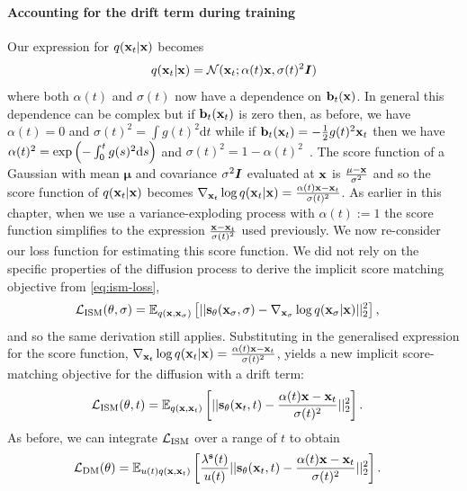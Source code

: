 \paragraph{Accounting for the drift term during training}
Our expression for $q({\mathbf{x}}_t|{\mathbf{x}})$ becomes
\begin{align}
    q({\mathbf{x}}_t|{\mathbf{x}}) = {\mathcal{N}}({\mathbf{x}}_t; \alpha(t){\mathbf{x}}, \sigma(t)^2{\bm{I}})
\end{align}
where both $\alpha(t)$ and $\sigma(t)$ now have a dependence on ${\mathbf{b}}_t({\mathbf{x}})$. In general this dependence can be complex but if ${\mathbf{b}}_t({\mathbf{x}}_t)$ is zero then, as before, we have $\alpha(t) = 0$ and $\sigma(t)^2 = \int g(t)^2 \mathrm{d}t$ while if ${\mathbf{b}}_t({\mathbf{x}}_t) = - \frac{1}{2}g(t)^2{\mathbf{x}}_t$ then we have $\alpha(t)^2 = \text{exp}\left( - \int_0^t g(s)^2 \mathrm{d} s \right)$ and $\sigma(t)^2 = 1 - \alpha(t)^2$~\citep{song2020score}. The score function of a Gaussian with mean $\mathbf{\mu}$ and covariance $\sigma^2{\bm{I}}$ evaluated at ${\mathbf{x}}$ is $\frac{\mathbf{\mu} - {\mathbf{x}}}{\sigma^2}$ and so the score function of $q({\mathbf{x}}_t|{\mathbf{x}})$ becomes $\nabla_{{\mathbf{x}}_t} \log q({\mathbf{x}}_t|{\mathbf{x}}) = \frac{\alpha(t){\mathbf{x}} - {\mathbf{x}}_t}{\sigma(t)^2}$. As earlier in this chapter, when we use a variance-exploding process with $\alpha(t) := 1$ the score function simplifies to the expression $\frac{{\mathbf{x}}-{\mathbf{x}}_t}{\sigma(t)^2}$ used previously. We now re-consider our loss function for estimating this score function. We did not rely on the specific properties of the diffusion process to derive the implicit score matching objective from \cref{eq:ism-loss},
\begin{align} \label{eq:ism-loss-with-drift}
    \mathcal{L}_\text{ISM}(\theta, \sigma) &= \mathbb{E}_{q({\mathbf{x}}, {\mathbf{x}}_\sigma)} \left[ 
    || {\mathbf{s}}_\theta({\mathbf{x}}_\sigma, \sigma) - \nabla_{{\mathbf{x}}_\sigma} \log q({\mathbf{x}}_\sigma|{\mathbf{x}}) ||_2^2 \right],
\end{align}
and so the same derivation still applies. Substituting in the generalised expression for the score function, $\nabla_{{\mathbf{x}}_t} \log q({\mathbf{x}}_t|{\mathbf{x}}) = \frac{\alpha(t){\mathbf{x}} - {\mathbf{x}}_t}{\sigma(t)^2}$, yields a new implicit score-matching objective for the diffusion with a drift term:
\begin{align}
    \mathcal{L}_\text{ISM}(\theta, t) &= \mathbb{E}_{q({\mathbf{x}}, {\mathbf{x}}_t)} \left[ || {\mathbf{s}}_\theta({\mathbf{x}}_t, t) - \frac{\alpha(t){\mathbf{x}} - {\mathbf{x}}_t}{\sigma(t)^2} ||_2^2 \right].
\end{align}
As before, we can integrate ${\mathcal{L}}_\text{ISM}$ over a range of $t$ to obtain
\begin{align} \label{eq:general-dm-loss}
    \mathcal{L}_\text{DM}(\theta) &= \mathbb{E}_{u(t)q({\mathbf{x}}, {\mathbf{x}}_t)} \left[ \frac{\lambda^{\mathbf{s}}(t)}{u(t)} || {\mathbf{s}}_\theta({\mathbf{x}}_t, t) - \frac{\alpha(t) {\mathbf{x}}-{\mathbf{x}}_t}{\sigma(t)^2} ||_2^2 \right].
\end{align}
